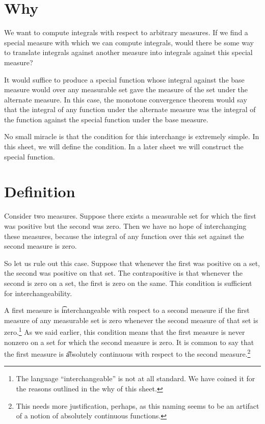 
\section*{Why}

We want to compute integrals with respect to arbitrary measures.
If we find a special measure with which we can compute integrals, would there be some way to translate integrals against another measure into integrals against this special measure?

It would suffice to produce a special function
whose integral against the base measure
would over any measurable set gave
the measure of the set under the alternate
measure.
In this case, the monotone convergence
theorem would say that the integral of
any function under the alternate
measure was the integral of the function
against the special function under the
base measure.

No small miracle is that the condition
for this interchange is extremely simple.
In this sheet, we will define the
condition. In a later sheet we will
construct the special function.

\section*{Definition}

Consider two measures.
Suppose there exists a measurable set for which the first was positive but the second was zero.
Then we have no hope of interchanging these measures, because the integral of any function over this set against the second measure is zero.

So let us rule out this case.
Suppose that whenever the first was positive on a set, the second was positive on that set.
The contrapositive is that whenever the second is zero on a set, the first is zero on the same.
This condition is sufficient for interchangeability.

A first measure is \t{interchangeable} with respect to a second measure if the first measure of any measurable set is zero whenever the second measure of that set is zero.\footnote{The language ``interchangeable'' is not at all standard. We have coined it for the reasons outlined in the why of this sheet.}
As we said earlier, this condition means that the first measure is never nonzero on a set for which the second measure is zero.
It is common to say that the first measure is \t{absolutely continuous} with respect to the second measure.\footnote{This needs more justification, perhaps, as this naming seems to be an artifact of a notion of absolutely continuous functions.}

